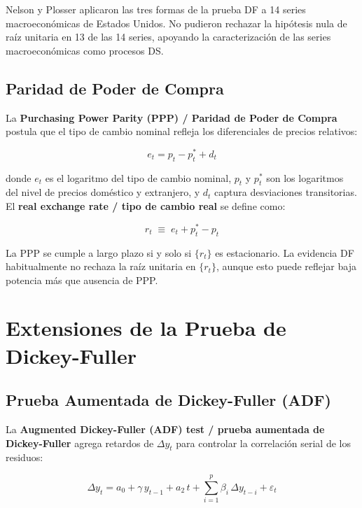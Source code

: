 \documentclass[12pt]{article}
\begin{document}
Nelson y Plosser aplicaron las tres formas de la prueba DF a 14 series
macroecon\'omicas de Estados Unidos. No pudieron rechazar la hip\'otesis
nula de ra\'iz unitaria en 13 de las 14 series, apoyando la
caracterizaci\'on de las series macroecon\'omicas como procesos DS.

\subsection{Paridad de Poder de Compra}

La \textbf{Purchasing Power Parity (PPP) / Paridad de Poder de Compra}
postula que el tipo de cambio nominal refleja los diferenciales de precios
relativos:

\begin{equation}
  e_t = p_t - p_t^* + d_t
\end{equation}

donde $e_t$ es el logaritmo del tipo de cambio nominal, $p_t$ y $p_t^*$
son los logaritmos del nivel de precios dom\'estico y extranjero, y $d_t$
captura desviaciones transitorias. El \textbf{real exchange rate / tipo de
cambio real} se define como:

\begin{equation}
  r_t \;\equiv\; e_t + p_t^* - p_t
\end{equation}

La PPP se cumple a largo plazo si y solo si $\{r_t\}$ es estacionario.
La evidencia DF habitualmente no rechaza la ra\'iz unitaria en $\{r_t\}$,
aunque esto puede reflejar baja potencia m\'as que ausencia de PPP.

\section{Extensiones de la Prueba de Dickey-Fuller}

\subsection{Prueba Aumentada de Dickey-Fuller (ADF)}

La \textbf{Augmented Dickey-Fuller (ADF) test / prueba aumentada de
Dickey-Fuller} agrega retardos de $\Delta y_t$ para controlar la
correlaci\'on serial de los residuos:

\begin{equation}
  \Delta y_t = a_0 + \gamma\,y_{t-1} + a_2\,t
               + \sum_{i=1}^{p}\beta_i\,\Delta y_{t-i} + \varepsilon_t
\end{equation}
\end{document}
